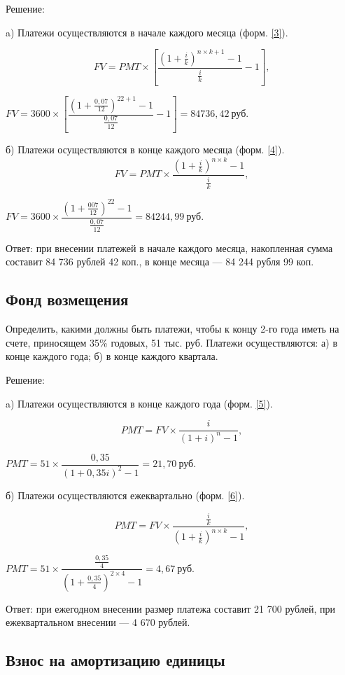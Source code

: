 Решение:

a) Платежи осуществляются в начале каждого месяца (форм. \ref{3}).

\begin{equation}\label{3}
FV = PMT \times \left[\dfrac{\left(1+\frac{i}{k}\right)^{n \times k +1}-1}{\frac{i}{k}}-1 \right],
\end{equation}

$ FV = 3600\times \left[\dfrac{\left(1+\frac{0,07}{12}\right)^{22+1}-1}{\frac{0,07}{12}}-1 \right] = 84736,42 \  \text{руб.}   $

б) Платежи осуществляются в конце каждого месяца (форм. \ref{4}).
\begin{equation}\label{4}
FV =PMT \times \dfrac{(1+\frac{i}{k})^{n \times k}-1}{\frac{i}{k}},
\end{equation}

$ FV =3600 \times \dfrac{(1+\frac{007}{12})^{22}-1}{\frac{0,07}{12}} = 84244,99 \  \text{руб.} $

Ответ: при внесении платежей в начале каждого месяца, накопленная сумма составит 84 736 рублей 42 коп., в конце месяца --- 84 244 рубля 99 коп.

\subsection{Фонд возмещения}

Определить, какими должны быть платежи, чтобы к концу 2-го года иметь на счете, приносящем 35\% годовых, 51 тыс. руб. Платежи осуществляются: а) в конце каждого года; б) в конце каждого квартала.

Решение:

a) Платежи осуществляются в конце каждого года (форм. \ref{5}).

\begin{equation}\label{5}
PMT = FV \times \dfrac{i}{(1+i)^n-1},
\end{equation}

$ PMT = 51 \times \dfrac{0,35}{(1+0,35i)^2-1} = 21,70 \  \text{руб.}$

б) Платежи осуществляются ежеквартально (форм. \ref{6}).

\begin{equation}\label{6}
PMT = FV \times \dfrac{\frac{i}{k}}{(1+\frac{i}{k})^{n \times k}-1},
\end{equation}

$ PMT = 51 \times \dfrac{\frac{0,35}{4}}{(1+\frac{0,35}{4})^{2 \times 4}-1} = 4,67\  \text{руб.} $

Ответ: при ежегодном внесении размер платежа составит 21 700 рублей, при ежеквартальном внесении --- 4 670 рублей.

\subsection{Взнос на амортизацию единицы}




